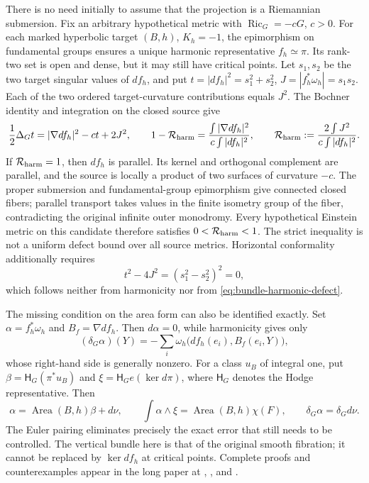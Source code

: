 \documentclass[a4paper,11pt]{article}
\numberwithin{equation}{section}
\theoremstyle{definition}
\newcommand{\Ric}{\operatorname{Ric}}
\begin{document}
There is no need initially to assume that the projection is a Riemannian submersion.
Fix an arbitrary hypothetical metric with $\Ric_G=-cG$, $c>0$.
For each marked hyperbolic target $(B,h)$, $K_h=-1$, the epimorphism on fundamental groups ensures a unique harmonic representative $f_h\simeq\pi$.
Its rank-two set is open and dense, but it may still have critical points.
Let $s_1,s_2$ be the two target singular values of $df_h$, and put
$t=|df_h|^2=s_1^2+s_2^2$, $J=|f_h^*\omega_h|=s_1s_2$.
Each of the two ordered target-curvature contributions equals $J^2$. The Bochner identity and integration on the closed source give
\begin{equation}\label{eq:bundle-harmonic-defect}
 \frac12\Delta_Gt=|\nabla df_h|^2-ct+2J^2,\qquad
 1-\mathcal R_{\rm harm}
 =\frac{\int|\nabla df_h|^2}{c\int|df_h|^2},\qquad
 \mathcal R_{\rm harm}:=\frac{2\int J^2}{c\int|df_h|^2}.
\end{equation}
If $\mathcal R_{\rm harm}=1$, then $df_h$ is parallel. Its kernel and orthogonal complement are parallel, and the source is locally a product of two surfaces of curvature $-c$.
The proper submersion and fundamental-group epimorphism give connected closed fibers; parallel transport takes values in the finite isometry group of the fiber, contradicting the original infinite outer monodromy.
Every hypothetical Einstein metric on this candidate therefore satisfies $0<\mathcal R_{\rm harm}<1$.
The strict inequality is not a uniform defect bound over all source metrics.
Horizontal conformality additionally requires
\begin{equation}\label{eq:bundle-harmonic-anisotropy}
 t^2-4J^2=(s_1^2-s_2^2)^2=0,
\end{equation}
which follows neither from harmonicity nor from \eqref{eq:bundle-harmonic-defect}.

The missing condition on the area form can also be identified exactly.
Set $\alpha=f_h^*\omega_h$ and $B_f=\nabla df_h$. Then $d\alpha=0$, while harmonicity gives only
\begin{equation}\label{eq:bundle-area-source}
 (\delta_G\alpha)(Y)
 =-\sum_i\omega_h\bigl(df_h(e_i),B_f(e_i,Y)\bigr),
\end{equation}
whose right-hand side is generally nonzero.
For a class $u_B$ of integral one, put
$\beta=\mathsf H_G(\pi^*u_B)$ and $\xi=\mathsf H_Ge(\ker d\pi)$, where $\mathsf H_G$ denotes the Hodge representative. Then
\begin{equation}\label{eq:bundle-euler-blindness}
 \alpha=\operatorname{Area}(B,h)\beta+d\nu,\qquad
 \int\alpha\wedge\xi=\operatorname{Area}(B,h)\chi(F),\qquad
 \delta_G\alpha=\delta_Gd\nu.
\end{equation}
The Euler pairing eliminates precisely the exact error that still needs to be controlled.
The vertical bundle here is that of the original smooth fibration; it cannot be replaced by $\ker df_h$ at critical points.
Complete proofs and counterexamples appear in the long paper at , , and .
\end{document}
